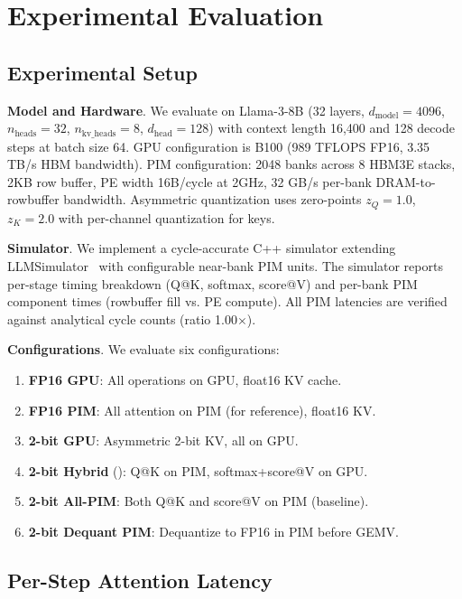 \section{Experimental Evaluation}
\label{sec:experiment}

\subsection{Experimental Setup}

\textbf{Model and Hardware}. We evaluate on Llama-3-8B (32 layers, $d_{\text{model}}\!=\!4096$, $n_{\text{heads}}\!=\!32$, $n_{\text{kv\_heads}}\!=\!8$, $d_{\text{head}}\!=\!128$) with context length 16,400 and 128 decode steps at batch size 64.
GPU configuration is B100 (989 TFLOPS FP16, 3.35 TB/s HBM bandwidth).
PIM configuration: 2048 banks across 8 HBM3E stacks, 2KB row buffer, PE width 16B/cycle at 2GHz, 32 GB/s per-bank DRAM-to-rowbuffer bandwidth.
Asymmetric quantization uses zero-points $z_Q\!=\!1.0$, $z_K\!=\!2.0$ with per-channel quantization for keys.

\textbf{Simulator}. We implement a cycle-accurate C++ simulator extending LLMSimulator~\citep{duplex} with configurable near-bank PIM units.
The simulator reports per-stage timing breakdown (Q@K, softmax, score@V) and per-bank PIM component times (rowbuffer fill vs. PE compute).
All PIM latencies are verified against analytical cycle counts (ratio 1.00$\times$).

\textbf{Configurations}. We evaluate six configurations:
\begin{enumerate}[leftmargin=*,nosep]
\item \textbf{FP16 GPU}: All operations on GPU, float16 KV cache.
\item \textbf{FP16 PIM}: All attention on PIM (for reference), float16 KV.
\item \textbf{2-bit GPU}: Asymmetric 2-bit KV, all on GPU.
\item \textbf{2-bit Hybrid} (\pimattn{}): Q@K on PIM, softmax+score@V on GPU.
\item \textbf{2-bit All-PIM}: Both Q@K and score@V on PIM (baseline).
\item \textbf{2-bit Dequant PIM}: Dequantize to FP16 in PIM before GEMV.
\end{enumerate}

\subsection{Per-Step Attention Latency}

